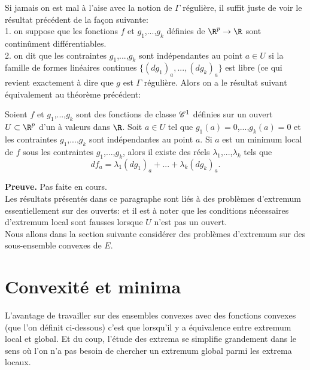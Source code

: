 \documentclass[class=report,crop=false]{standalone}
\begin{document}
\noindent Si jamais on est mal à l'aise avec la notion de $\Gamma$ régulière, il suffit juste de voir le résultat précédent de la façon suivante:\\
1. on suppose que les fonctions $f$ et $g_1$,...,$g_k$ définies de $\R^p \rightarrow \R$ sont contin\^ument diff\'erentiables.\\
2. on dit que les contraintes $g_1$,...,$g_k$ sont ind\'ependantes au point $a \in U$ si la famille de formes
lin\'eaires continues $\{(dg_1)_a,...,(dg_k)_a\}$ est libre (ce qui revient exactement à dire que $g$ est $\Gamma$ régulière. Alors on a le résultat suivant équivalement au théorème précédent:


\begin{theoreme}
\textcolor[rgb]{0.44,0.00,0.87}{
  Soient $f$ et $g_1$,...,$g_k$ sont des fonctions de classe $\mathscr{C}^1$ d\'efinies sur un ouvert $U\subset \R^p$ d'un
 \`a valeurs dans $\R$. Soit $a \in U$ tel que  $g_1(a)=0$,...,$g_k(a)=0$ et les contraintes
$g_1$,...,$g_k$ sont ind\'ependantes au point $a$. Si $a$ est un minimum local de $f$ sous les contraintes
$g_1$,...,$g_k$, alors il existe des r\'eels $\lambda_1$,...,$\lambda_k$ tels que
\begin{equation*}
  df_a=\lambda_1 (dg_1)_a+...+\lambda_k (dg_k)_a.
\end{equation*}}
\end{theoreme}


{\textbf{Preuve.}} Pas faite en cours.\\
Les r\'esultats pr\'esent\'es dans ce paragraphe sont li\'es \`a des probl\`emes d'extremum essentiellement
sur des ouverts: et il est \`a noter que les conditions n\'ecessaires d'extremum local sont fausses
lorsque $U$ n'est pas un ouvert. \\
Nous allons dans la section suivante consid\'erer des probl\`emes d'extremum sur des sous-ensemble convexes de $E$.

\section{Convexit\'e et minima}

L'avantage de travailler sur des ensembles convexes avec des fonctions convexes (que l'on définit ci-dessous) c'est que lorsqu'il
y a équivalence entre extremum local et global. Et du coup, l'étude des extrema se simplifie grandement dans le sens
où l'on n'a pas besoin de chercher un extremum global parmi les extrema locaux.
\end{document}
